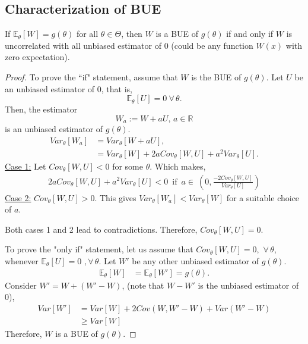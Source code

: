 \documentclass[a4paper,english,12pt]{article}
\begin{document}
\subsection{Characterization of BUE}
\begin{thm}
If $\mathbb{E}_\theta[W]=g(\theta)$ for all $\theta\in\Theta$, then $W$ is a BUE of $g(\theta)$ if and only if $W$ is uncorrelated with all unbiased estimator of $0$ (could be any function $W(x)$ with zero expectation).
\end{thm} 
\begin{proof}
To prove the ``if" statement, assume that $W$ is the BUE of $g(\theta)$. Let $U$ be an unbiased estimator of $0$, that is, 
\begin{equation*}
\mathbb{E}_\theta[U]=0 ~\forall\, \theta.
\end{equation*}
Then, the estimator 
\begin{equation*}
W_a:=W+aU,\,a\in\mathbb{R}
\end{equation*}
is an unbiased estimator of $g(\theta)$.
\begin{align}
\nonumber
Var_\theta[W_a]&=Var_\theta[W+aU],\\
&=Var_\theta[W]+2aCov_\theta[W,U]+a^2Var_\theta[U].
\end{align}
\underline{Case 1:} Let $Cov_\theta[W,U]<0$ for some $\theta$.
Which makes, 
\begin{align}
2aCov_\theta[W,U]+a^2Var_\theta[U]<0 \, \, \,\mbox{if}\, \, \, a\in\ \left(0,\frac{-2Cov_\theta[W,U]}{Var_\theta[U]} \right)
\end{align}
\underline{Case 2:} $Cov_\theta[W,U]>0.$
This gives $Var_\theta[W_a]<Var_\theta[W]$ for a suitable choice of $a$.
\par Both cases 1 and 2 lead to contradictions. Therefore, $Cov_\theta[W,U]=0$.
\par To prove the "only if" statement, let us assume that $ Cov_\theta[W,U]=0, \,\,\forall \,\theta$, whenever $\mathbb{E}_\theta[U]=0\,\, , \forall \,\theta$. Let $W'$ be any other unbiased estimator of $g(\theta)$.
\begin{align*}
\mathbb{E}_\theta[W]&=\mathbb{E}_\theta[W']=g(\theta).
\end{align*}
Consider $W'=W+(W'-W)$, (note that $W-W'$ is the unbiased estimator of $0$),
\begin{align*}
Var[W']&=Var[W]+2Cov(W,W'-W)+Var(W'-W)\\
&\geq Var[W]
\end{align*}
Therefore, $W$ is a BUE of $g(\theta)$.
\end{proof}
\end{document}

